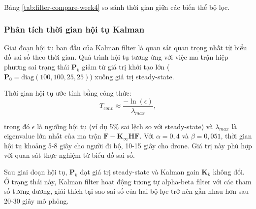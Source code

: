 Bảng \ref{tab:filter-compare-week4} so sánh thời gian giữa các biến thể bộ lọc.

\begin{table}[H]
\centering
\caption{So sánh thời gian giữa các biến thể bộ lọc}
\label{tab:filter-compare-week4}
\end{table}

\subsubsection{Phân tích thời gian hội tụ Kalman}

\hspace{0.5cm} Giai đoạn hội tụ ban đầu của Kalman filter là quan sát quan trọng nhất từ biểu đồ sai số theo thời gian. Quá trình hội tụ tương ứng với việc ma trận hiệp phương sai trạng thái $\mathbf{P}_k$ giảm từ giá trị khởi tạo lớn ($\mathbf{P}_0 = \text{diag}(100, 100, 25, 25)$) xuống giá trị steady-state.

Thời gian hội tụ ước tính bằng công thức:
\begin{equation}
T_{conv} \approx \frac{-\ln(\epsilon)}{\lambda_{max}},
\end{equation}

trong đó $\epsilon$ là ngưỡng hội tụ (ví dụ 5\% sai lệch so với steady-state) và $\lambda_{max}$ là eigenvalue lớn nhất của ma trận $\mathbf{F} - \mathbf{K}_\infty \mathbf{H} \mathbf{F}$. Với $\alpha = 0{,}4$ và $\beta = 0{,}051$, thời gian hội tụ khoảng 5-8 giây cho người đi bộ, 10-15 giây cho drone. Giá trị này phù hợp với quan sát thực nghiệm từ biểu đồ sai số.

Sau giai đoạn hội tụ, $\mathbf{P}_k$ đạt giá trị steady-state và Kalman gain $\mathbf{K}_k$ không đổi. Ở trạng thái này, Kalman filter hoạt động tương tự alpha-beta filter với các tham số tương đương, giải thích tại sao sai số của hai bộ lọc trở nên gần nhau hơn sau 20-30 giây mô phỏng.

